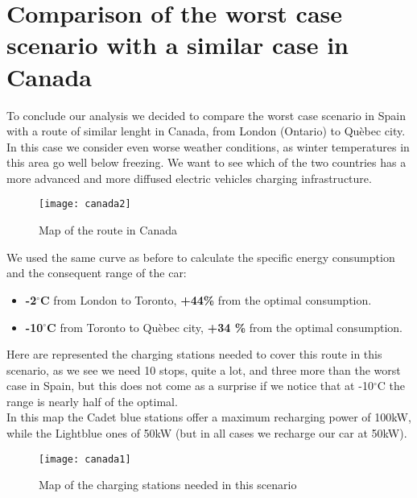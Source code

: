 \documentclass{article}
\begin{document}
\section{Comparison of the worst case scenario with a similar case in Canada}
To conclude our analysis we decided to compare the worst case scenario in Spain with a route of similar lenght in Canada, from London (Ontario) to Quèbec city. In this case we consider even worse weather conditions, as winter temperatures in this area go well below freezing. We want to see which of the two countries has a more advanced and more diffused electric vehicles charging infrastructure.
\begin{figure}[H]
{\centering
\texttt{[image: canada2]}
\caption{Map of the route in Canada \cite{OSM}}}
\end{figure}
We used the same curve as before to calculate the specific energy consumption and the consequent range of the car:
\begin{itemize}
\item \textbf{-2$^{\circ}$C} from London to Toronto, \textbf{+44\%} from the optimal consumption.
\item \textbf{-10$^{\circ}$C} from Toronto to Quèbec city, \textbf{+34 \%} from the optimal consumption.
\end{itemize}
Here are represented the charging stations needed to cover this route in this scenario, as we see we need 10 stops, quite a lot, and three more than the worst case in Spain, but this does not come as a surprise if we notice that at -10$^{\circ}$C the range is nearly half of the optimal.\\
In this map the Cadet blue stations offer a maximum recharging power of 100kW, while the Lightblue ones of 50kW (but in all cases we recharge our car at 50kW).
\begin{figure}[H]
{\centering
\texttt{[image: canada1]}
\caption{Map of the charging stations needed in this scenario}}
\end{figure}

{}
\newpage
\end{document}
